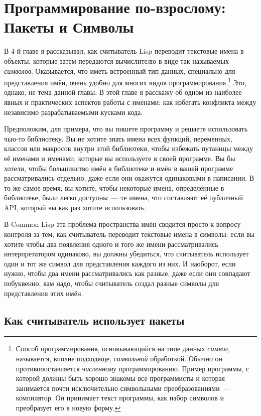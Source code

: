 \chapter{Программирование по-взрослому: Пакеты и Символы}
\label{ch:21}

В 4-й главе я рассказывал, как считыватель Lisp переводит текстовые имена в объекты,
которые затем передаются вычислителю в виде так называемых \textit{символов}.
Оказывается, что иметь встроенный тип данных, специально для представления имён, очень
удобно для многих видов программирования.\footnote{Способ программирования, основывающийся
  на типе данных \textit{символ}, называется, вполне подходяще, \textit{символьной}
  обработкой. Обычно он противопоставляется \textit{численному} программированию.  Пример
  программы, с которой должны быть хорошо знакомы все программисты и которая занимается
  почти исключительно символьными преобразованиями~--- компилятор. Он принимает текст
  программы, как набор символов и преобразует его в новую форму.} Это, однако, не тема
данной главы. В этой главе я расскажу об одном из наиболее явных и практических аспектов
работы с именами: как избегать конфликта между независимо разрабатываемыми кусками кода.

Предположим, для примера, что вы пишете программу и решаете использовать чью-то
библиотеку.  Вы не хотите знать имена всех функций, переменных, классов или макросов
внутри этой библиотеки, чтобы избежать путаницы между её именами и именами, которые вы
используете в своей программе. Вы бы хотели, чтобы большинство имён в библиотеке и имён в
вашей программе рассматривались отдельно, даже если они окажутся одинаковыми в написании.
В то же самое время, вы хотите, чтобы некоторые имена, определённые в библиотеке, были
легко доступны~--- те имена, что составляют её публичный API, который вы как раз хотите
использовать.

В Common Lisp эта проблема пространства имён сводится просто к вопросу контроля за тем,
как считыватель переводит текстовые имена в символы: если вы хотите чтобы два появления
одного и того же имени рассматривались интерпретатором одинаково, вы должны убедиться, что
считыватель использует один и тот же символ для представления каждого из них. И наоборот,
если нужно, чтобы два имени рассматривались как разные, даже если они совпадают
побуквенно, вам надо, чтобы считыватель создал разные символы для представления этих имён.

\section{Как считыватель использует пакеты}

